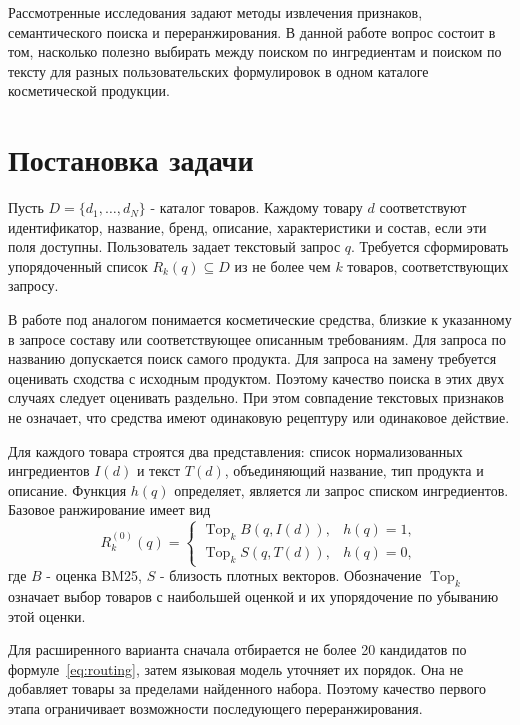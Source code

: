 \documentclass{misisarticle}
\begin{document}
Рассмотренные исследования задают методы извлечения признаков, семантического поиска и переранжирования. В данной работе вопрос состоит в том, насколько полезно выбирать между поиском по ингредиентам и поиском по тексту для разных пользовательских формулировок в одном каталоге косметической продукции.

\section{Постановка задачи}

Пусть $D=\{d_1,\ldots,d_N\}$ - каталог товаров. Каждому товару $d$ соответствуют идентификатор, название, бренд, описание, характеристики и состав, если эти поля доступны. Пользователь задает текстовый запрос $q$. Требуется сформировать упорядоченный список $R_k(q)\subseteq D$ из не более чем $k$ товаров, соответствующих запросу.

В работе под аналогом понимается косметические средства, близкие к указанному в запросе составу или соответствующее описанным требованиям. Для запроса по названию допускается поиск самого продукта. Для запроса на замену требуется оценивать сходства с исходным продуктом. Поэтому качество поиска в этих двух случаях следует оценивать раздельно. При этом совпадение текстовых признаков не означает, что средства имеют одинаковую рецептуру или одинаковое действие. 

Для каждого товара строятся два представления: список нормализованных ингредиентов $I(d)$ и текст $T(d)$, объединяющий название, тип продукта и описание. Функция $h(q)$ определяет, является ли запрос списком ингредиентов. Базовое ранжирование имеет вид
\begin{equation}
R_k^{(0)}(q)=
\begin{cases}
\operatorname{Top}_k B(q,I(d)), & h(q)=1,\\
\operatorname{Top}_k S(q,T(d)), & h(q)=0,
\end{cases}
\label{eq:routing}
\end{equation}
где $B$ - оценка BM25, $S$ - близость плотных векторов. Обозначение $\operatorname{Top}_k$ означает выбор товаров с наибольшей оценкой и их упорядочение по убыванию этой оценки.

Для расширенного варианта сначала отбирается не более 20 кандидатов по формуле~\eqref{eq:routing}, затем языковая модель уточняет их порядок. Она не добавляет товары за пределами найденного набора. Поэтому качество первого этапа ограничивает возможности последующего переранжирования.
\end{document}
